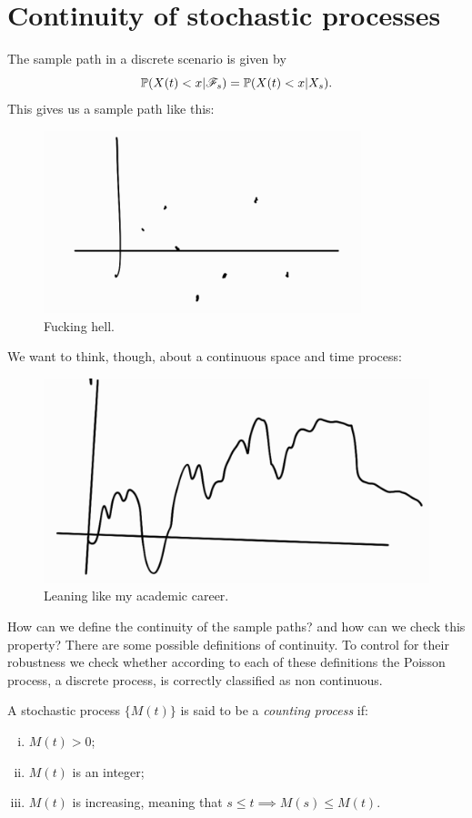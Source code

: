\documentclass[12pt]{report}
\begin{document}
	\section{Continuity of stochastic processes}
	The sample path in a discrete scenario is given by
	\begin{equation*}
		\mathbb{P}(X(t)<x|\mathscr{F}_{s})=\mathbb{P}(X(t)<x|X_{s}).
	\end{equation*}
	This gives us a sample path like this:
	\begin{figure}[H]
		\centering
		\includegraphics[width=0.7\linewidth]{img/screenshot003}
		\caption{Fucking hell.}
		\label{fig:screenshot003}
	\end{figure}
	We want to think, though, about a continuous space and time process: 
	\begin{figure}[H]
		\centering
		\includegraphics[width=0.7\linewidth]{img/screenshot004}
		\caption{Leaning like my academic career.}
		\label{fig:screenshot004}
	\end{figure}
	How can we define the continuity of the sample paths? and how can we check this property? There are some possible definitions of continuity. To control for their robustness we check whether according to each of these definitions the Poisson process, a discrete process, is correctly classified as non continuous.
	\begin{definition}
		A stochastic process $\{M(t)\}$ is said to be a \emph{counting process} if:
		\begin{enumerate}[i.]
			\item $M(t)>0$;
			\item $M(t)$ is an integer;
			\item $M(t)$ is increasing, meaning that $s\leq t\implies M(s)\leq M(t)$.
		\end{enumerate}
	\end{definition}
\end{document}

